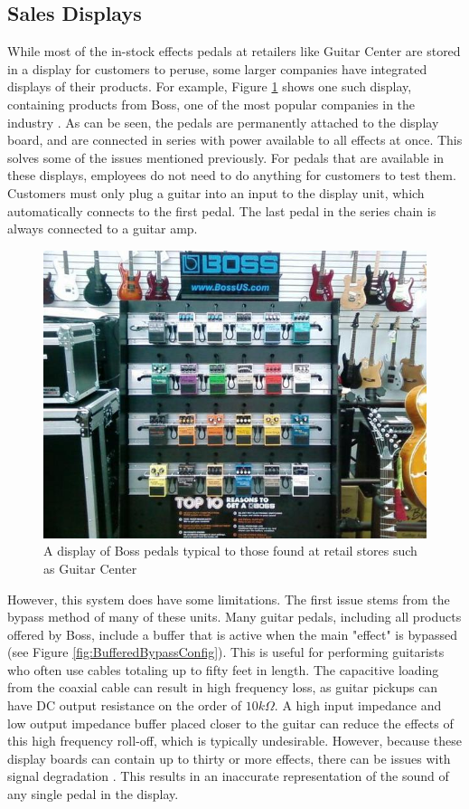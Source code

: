 \documentclass{article}
\begin{document}
	\subsection{Sales Displays}
	While most of the in-stock effects pedals at retailers like Guitar Center are stored in a display for customers to peruse, some larger companies have integrated displays of their products.  For example, Figure \ref{fig:BossDisplay} shows one such display, containing products from Boss, one of the most popular companies in the industry \cite{ReverbMostPopular}.  As can be seen, the pedals are permanently attached to the display board, and are connected in series with power available to all effects at once.  This solves some of the issues mentioned previously.  For pedals that are available in these displays, employees do not need to do anything for customers to test them.  Customers must only plug a guitar into an input to the display unit, which automatically connects to the first pedal.  The last pedal in the series chain is always connected to a guitar amp.

	\begin{figure}
		\centering
		\includegraphics[width = 0.6 \textwidth]{PR2Images/BossDisplay.jpg}
		\caption{A display of Boss pedals typical to those found at retail stores such as Guitar Center \cite{BossDisplayPhoto}}
		\label{fig:BossDisplay}
	\end{figure}

	However, this system does have some limitations.  The first issue stems from the bypass method of many of these units.  Many guitar pedals, including all products offered by Boss, include a buffer that is active when the main "effect" is bypassed (see Figure \ref{fig:BufferedBypassConfig}).  This is useful for performing guitarists who often use cables totaling up to fifty feet in length.  The capacitive loading from the coaxial cable can result in high frequency loss, as guitar pickups can have DC output resistance on the order of $10k\Omega$.  A high input impedance and low output impedance buffer placed closer to the guitar can reduce the effects of this high frequency roll-off, which is typically undesirable.  However, because these display boards can contain up to thirty or more effects, there can be issues with signal degradation \cite{OrmanBypassMeasurements}.  This results in an inaccurate representation of the sound of any single pedal in the display.
\end{document}
